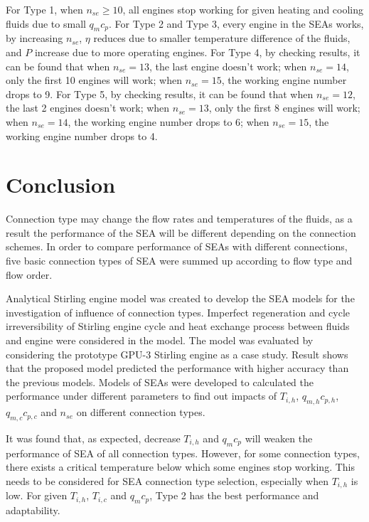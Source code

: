 \documentclass[preprint,5p, twocolumn]{elsarticle}
\begin{document}
For Type 1, when $n_{se} \geqslant 10$, all engines stop working for given heating and cooling fluids due to small $q_mc_p$. For Type 2 and Type 3, every engine in the SEAs works, by increasing $n_{se}$, $\eta$ reduces due to smaller temperature difference of the fluids, and $P$ increase due to more operating engines. For Type 4, by checking results, it can be found that when $n_{se} = 13$,  the last engine doesn't work; when $n_{se} = 14$, only the first 10 engines will work; when $n_{se} = 15$, the working engine number drops to 9. For Type 5, by checking results, it can be found that when $n_{se} = 12$, the last 2 engines doesn't work; when $n_{se} = 13$, only the first 8 engines will work; when $n_{se} = 14$, the working engine number drops to 6; when $n_{se} = 15$, the working engine number drops to 4.

\section{Conclusion}

Connection type may change the flow rates and temperatures of the fluids, as a result the performance of the SEA will be different depending on the connection schemes. In order to compare performance of SEAs with different connections, five basic connection types of SEA were summed up according to flow type and flow order. 

Analytical Stirling engine model was created to develop the SEA models for the investigation of influence of connection types. Imperfect regeneration and cycle irreversibility of Stirling engine cycle and heat exchange process between fluids and engine were considered in the model. The model was evaluated by considering the prototype GPU-3 Stirling engine as a case study. Result shows that the proposed model predicted the performance with higher accuracy than the previous models. Models of SEAs were developed to calculated the performance under different parameters to find out impacts of $T_{i,h}$, $q_{m,h}c_{p,h}$, $q_{m,c}c_{p,c}$ and $n_{se}$ on different connection types.

It was found that, as expected, decrease $T_{i,h}$ and $q_{m}c_{p}$ will weaken the performance of SEA of all connection types. However, for some connection types, there exists a critical temperature below which some engines stop working. This needs to be considered for SEA connection type selection, especially when $T_{i,h}$ is low. For given $T_{i,h}$, $T_{i,c}$ and $q_mc_p$, Type 2 has the best performance and adaptability.
\end{document}
